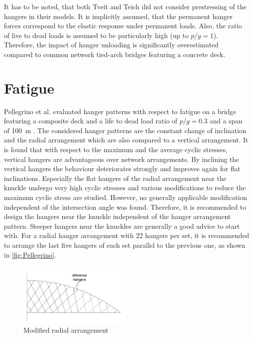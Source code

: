 It has to be noted, that both Tveit and Teich did not consider prestressing of the hangers in their models. It is implicitly assumed, that the permanent hanger forces correspond to the elastic response under permanent loads. Also, the ratio of live to dead loads is assumed to be particularly high (up to $p/g=1$). Therefore, the impact of hanger unloading is significantly overestimated compared to common network tied-arch bridges featuring a concrete deck.

\section{Fatigue} \label{sec:rev_fat}
Pellegrino et al. evaluated hanger patterns with respect to fatigue on a bridge featuring a composite deck and a life to dead load ratio of $p/g=0.3$ and a span of \SI{100}{m} \cite{Pellegrino}. The considered hanger patterns are the constant change of inclination and the radial arrangement which are also compared to a vertical arrangement. It is found that with respect to the maximum and the average cyclic stresses, vertical hangers are advantageous over network arrangements. By inclining the vertical hangers the behaviour deteriorates strongly and improves again for flat inclinations. Especially the flat hangers of the radial arrangement near the knuckle undergo very high cyclic stresses and various modifications to reduce the maximum cyclic stress are studied. However, no generally applicable modification independent of the intersection angle was found. Therefore, it is recommended to design the hangers near the knuckle independent of the hanger arrangement pattern. Steeper hangers near the knuckles are generally a good advice to start with. For a radial hanger arrangement with 22 hangers per set, it is recommended to arrange the last five hangers of each set parallel to the previous one, as shown in \autoref{fig:Pellegrino}.
\begin{figure}[H]
    \centering
    \includegraphics[width=0.5\textwidth]{Pictures/PellegrinoArrangement.png}
    \caption{Modified radial arrangement \cite{Pellegrino}}
    \label{fig:Pellegrino}
\end{figure}


